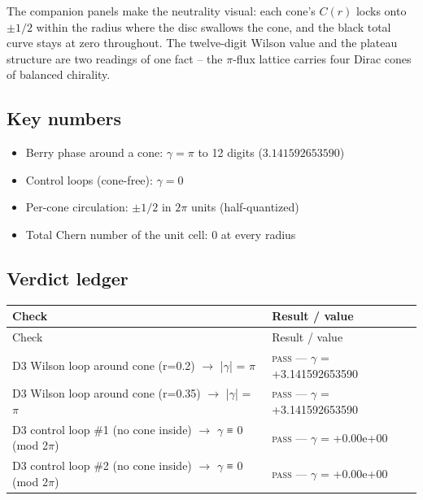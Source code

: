 \documentclass[11pt,a4paper]{article}
\begin{document}
The companion panels make the neutrality visual: each cone's $C(r)$ locks onto $\pm 1/2$ within the radius where the disc swallows the cone, and the black total curve stays at zero throughout. The twelve-digit Wilson value and the plateau structure are two readings of one fact -- the $\pi$-flux lattice carries four Dirac cones of balanced chirality.

\subsection{Key numbers}
\begin{tcolorbox}[colback=labblue!6, colframe=labblue!70!black, boxrule=0.6pt, title={Key results (canonical run)}]
\begin{itemize}[leftmargin=1.2em, itemsep=0.15em]
\item Berry phase around a cone: $\gamma = \pi$ to 12 digits ($3.141592653590$)
\item Control loops (cone-free): $\gamma = 0$
\item Per-cone circulation: $\pm 1/2$ in $2\pi$ units (half-quantized)
\item Total Chern number of the unit cell: $0$ at every radius
\end{itemize}
\end{tcolorbox}

\subsection{Verdict ledger}
\begin{longtable}{@{}p{}p{}@{}}
\toprule
Check & Result / value \\
\midrule
\endfirsthead
\toprule
Check & Result / value \\
\midrule
\endhead
\bottomrule
\endfoot
D3 Wilson loop around cone (r=0.2) $\to$ |$\gamma$| = $\pi$ & \textsc{pass} --- $\gamma$ = +3.141592653590 \\
D3 Wilson loop around cone (r=0.35) $\to$ |$\gamma$| = $\pi$ & \textsc{pass} --- $\gamma$ = +3.141592653590 \\
D3 control loop \#1 (no cone inside) $\to$ $\gamma$ ≡ 0 (mod 2$\pi$) & \textsc{pass} --- $\gamma$ = +0.00e+00 \\
D3 control loop \#2 (no cone inside) $\to$ $\gamma$ ≡ 0 (mod 2$\pi$) & \textsc{pass} --- $\gamma$ = +0.00e+00 \\
\end{longtable}
\end{document}
